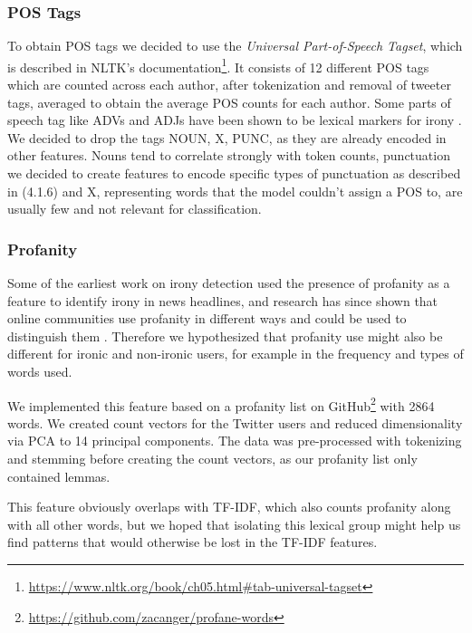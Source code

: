     \subsubsection{POS Tags}
        To obtain POS tags we decided to use the \emph{Universal Part-of-Speech Tagset}, which is described in NLTK's documentation\footnote{\url{https://www.nltk.org/book/ch05.html#tab-universal-tagset}}. It consists of 12 different POS tags which are counted across each author, after tokenization and removal of tweeter tags, averaged to obtain the average POS counts for each author. Some parts of speech tag like ADVs and ADJs have been shown to be lexical markers for irony \cite{irony_detect_twitter}. We decided to drop the tags NOUN, X, PUNC, as they are already encoded in other features. Nouns tend to correlate strongly with token counts, punctuation we decided to create features to encode specific types of punctuation as described in (4.1.6) and X, representing words that the model couldn't assign a POS to, are usually few and not relevant for classification.
        
    
    \subsubsection{Profanity}
    
    
    Some of the earliest work on irony detection \cite{burfoot2009automatic} used the presence of profanity as a feature to identify irony in news headlines, and research has since shown that online communities use profanity in different ways and could be used to distinguish them \cite{wang2014cursing}. Therefore we hypothesized that profanity use might also be different for ironic and non-ironic users, for example in the frequency and types of words used. 
    
    We implemented this feature based on a profanity list on GitHub\footnote{\url{https://github.com/zacanger/profane-words}} with 2864 words. We created count vectors for the Twitter users and reduced dimensionality via PCA to 14 principal components. The data was pre-processed with tokenizing and stemming before creating the count vectors, as our profanity list only contained lemmas. 
    
    This feature obviously overlaps with TF-IDF, which also counts profanity along with all other words, but we hoped that isolating this lexical group might help us find patterns that would otherwise be lost in the TF-IDF features. 
    

